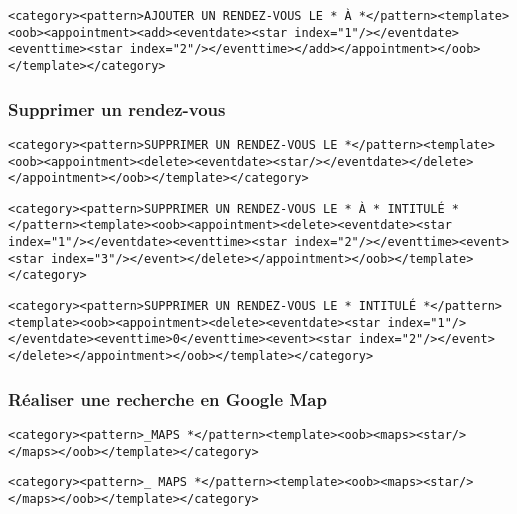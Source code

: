 \begin{lstlisting}[frame=none,aboveskip=0.5em]
<category><pattern>AJOUTER UN RENDEZ-VOUS LE * À *</pattern><template><oob><appointment><add><eventdate><star index="1"/></eventdate><eventtime><star index="2"/></eventtime></add></appointment></oob></template></category>
\end{lstlisting}

\subsubsection{Supprimer un rendez-vous}
\begin{lstlisting}[frame=none,aboveskip=0.5em]
<category><pattern>SUPPRIMER UN RENDEZ-VOUS LE *</pattern><template><oob><appointment><delete><eventdate><star/></eventdate></delete></appointment></oob></template></category>
\end{lstlisting}

\begin{lstlisting}[frame=none,aboveskip=0.5em]
<category><pattern>SUPPRIMER UN RENDEZ-VOUS LE * À * INTITULÉ *</pattern><template><oob><appointment><delete><eventdate><star index="1"/></eventdate><eventtime><star index="2"/></eventtime><event><star index="3"/></event></delete></appointment></oob></template></category>
\end{lstlisting}

\begin{lstlisting}[frame=none,aboveskip=0.5em]
<category><pattern>SUPPRIMER UN RENDEZ-VOUS LE * INTITULÉ *</pattern><template><oob><appointment><delete><eventdate><star index="1"/></eventdate><eventtime>0</eventtime><event><star index="2"/></event></delete></appointment></oob></template></category>
\end{lstlisting}

\subsubsection{Réaliser une recherche en Google Map}
\begin{lstlisting}[frame=none,aboveskip=0.5em]
<category><pattern>_MAPS *</pattern><template><oob><maps><star/></maps></oob></template></category>
\end{lstlisting}

\begin{lstlisting}[frame=none,aboveskip=0.5em]
<category><pattern>_ MAPS *</pattern><template><oob><maps><star/></maps></oob></template></category>
\end{lstlisting}

